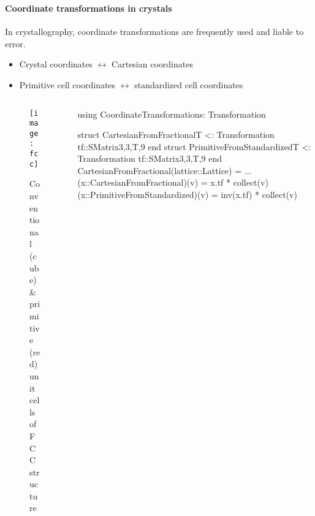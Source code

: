 \begin{frame}[fragile]
    \frametitle{\subsubsecname}
    \framesubtitle{Coordinate transformations in crystals}

    In crystallography, coordinate transformations are frequently used and liable to error.
    \begin{itemize}
        \item Crystal coordinates $\leftrightarrow$ Cartesian coordinates
        \item Primitive cell coordinates $\leftrightarrow$ standardized cell coordinates
    \end{itemize}

    \begin{columns}[t]
        \begin{column}[T, onlytextwidth]{0.2\textwidth}
            \begin{figure}
                \texttt{[image: fcc]}
                \captionsetup{font=tiny}
                \caption{Conventional (cube) \& primitive (red) unit cells of FCC structure}
            \end{figure}
        \end{column}

        \begin{column}[T]{0.8\textwidth}
            {\scriptsize
                \begin{algorithmblock}
                    \begin{juliaverbatim}
using CoordinateTransformations: Transformation

struct CartesianFromFractional{T} <: Transformation
    tf::SMatrix{3,3,T,9}
end
struct PrimitiveFromStandardized{T} <: Transformation
    tf::SMatrix{3,3,T,9}
end
CartesianFromFractional(lattice::Lattice) = ...
(x::CartesianFromFractional)(v) = x.tf * collect(v)
(x::PrimitiveFromStandardized)(v) = inv(x.tf) * collect(v)
        \end{juliaverbatim}
                \end{algorithmblock}
            }
        \end{column}
    \end{columns}
\end{frame}

